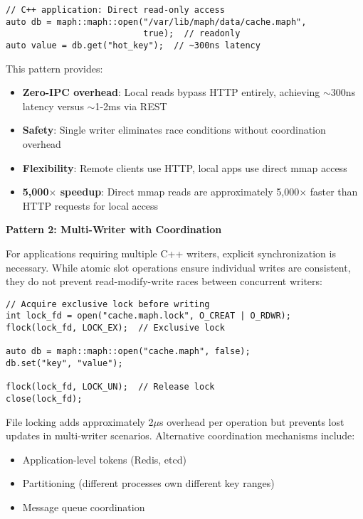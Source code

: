 \documentclass[10pt,conference]{IEEEtran}
\begin{document}
\begin{lstlisting}[caption={Direct mmap read access},label={lst:direct-read}]
// C++ application: Direct read-only access
auto db = maph::maph::open("/var/lib/maph/data/cache.maph",
                           true);  // readonly
auto value = db.get("hot_key");  // ~300ns latency
\end{lstlisting}

This pattern provides:
\begin{itemize}
\item \textbf{Zero-IPC overhead}: Local reads bypass HTTP entirely, achieving $\sim$300ns latency versus $\sim$1-2ms via REST
\item \textbf{Safety}: Single writer eliminates race conditions without coordination overhead
\item \textbf{Flexibility}: Remote clients use HTTP, local apps use direct mmap access
\item \textbf{5,000$\times$ speedup}: Direct mmap reads are approximately 5,000$\times$ faster than HTTP requests for local access
\end{itemize}

\textbf{Pattern 2: Multi-Writer with Coordination}

For applications requiring multiple C++ writers, explicit synchronization is necessary. While atomic slot operations ensure individual writes are consistent, they do not prevent read-modify-write races between concurrent writers:

\begin{lstlisting}[caption={File locking for multi-writer safety},label={lst:file-lock}]
// Acquire exclusive lock before writing
int lock_fd = open("cache.maph.lock", O_CREAT | O_RDWR);
flock(lock_fd, LOCK_EX);  // Exclusive lock

auto db = maph::maph::open("cache.maph", false);
db.set("key", "value");

flock(lock_fd, LOCK_UN);  // Release lock
close(lock_fd);
\end{lstlisting}

File locking adds approximately 2$\mu$s overhead per operation but prevents lost updates in multi-writer scenarios. Alternative coordination mechanisms include:
\begin{itemize}
\item Application-level tokens (Redis, etcd)
\item Partitioning (different processes own different key ranges)
\item Message queue coordination
\end{itemize}
\end{document}
